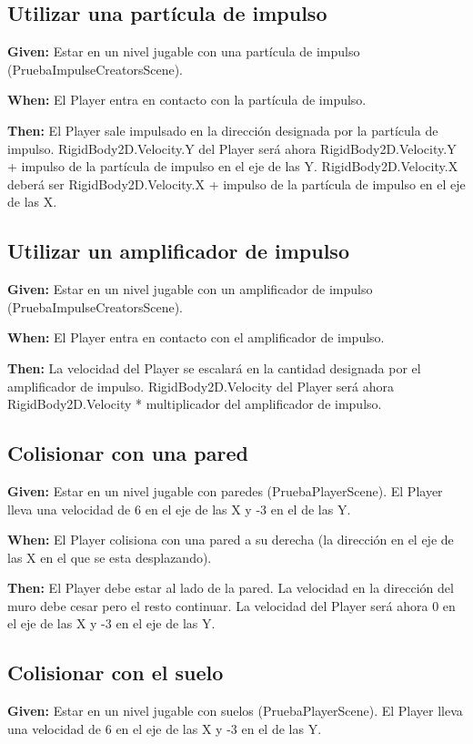 \subsection{Utilizar una partícula de impulso}
\textbf{Given:} Estar en un nivel jugable con una partícula de impulso (PruebaImpulseCreatorsScene).

\textbf{When:} El Player entra en contacto con la partícula de impulso.

\textbf{Then:} El Player sale impulsado en la dirección designada por la partícula de impulso. RigidBody2D.Velocity.Y del Player será ahora RigidBody2D.Velocity.Y + impulso de la partícula de impulso en el eje de las Y. RigidBody2D.Velocity.X deberá ser RigidBody2D.Velocity.X + impulso de la partícula de impulso en el eje de las X.

\subsection{Utilizar un amplificador de impulso}
\textbf{Given:} Estar en un nivel jugable con un amplificador de impulso (PruebaImpulseCreatorsScene).

\textbf{When:} El Player entra en contacto con el amplificador de impulso.

\textbf{Then:} La velocidad del Player se escalará en la cantidad designada por el amplificador de impulso. RigidBody2D.Velocity del Player será ahora RigidBody2D.Velocity * multiplicador del amplificador de impulso.

\subsection{Colisionar con una pared}
\textbf{Given:} Estar en un nivel jugable con paredes (PruebaPlayerScene). El Player lleva una velocidad de 6 en el eje de las X y -3 en el de las Y.

\textbf{When:} El Player colisiona con una pared a su derecha (la dirección en el eje de las X en el que se esta desplazando).

\textbf{Then:} El Player debe estar al lado de la pared. La velocidad en la dirección del muro debe cesar pero el resto continuar. La velocidad del Player será ahora 0 en el eje de las X y -3 en el eje de las Y.

\subsection{Colisionar con el suelo}
\textbf{Given:} Estar en un nivel jugable con suelos (PruebaPlayerScene). El Player lleva una velocidad de 6 en el eje de las X y -3 en el de las Y.


